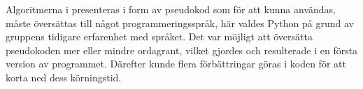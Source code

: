 Algoritmerna i \cite{HaraldSieve} presenteras i form av pseudokod som för att kunna användas, måste översättas till något programmeringsspråk, här valdes Python på grund av gruppens tidigare erfarenhet med språket. Det var möjligt att översätta pseudokoden mer eller mindre ordagrant, vilket gjordes och resulterade i en första version av programmet. Därefter kunde flera förbättringar göras i koden för att korta ned dess körningstid.





